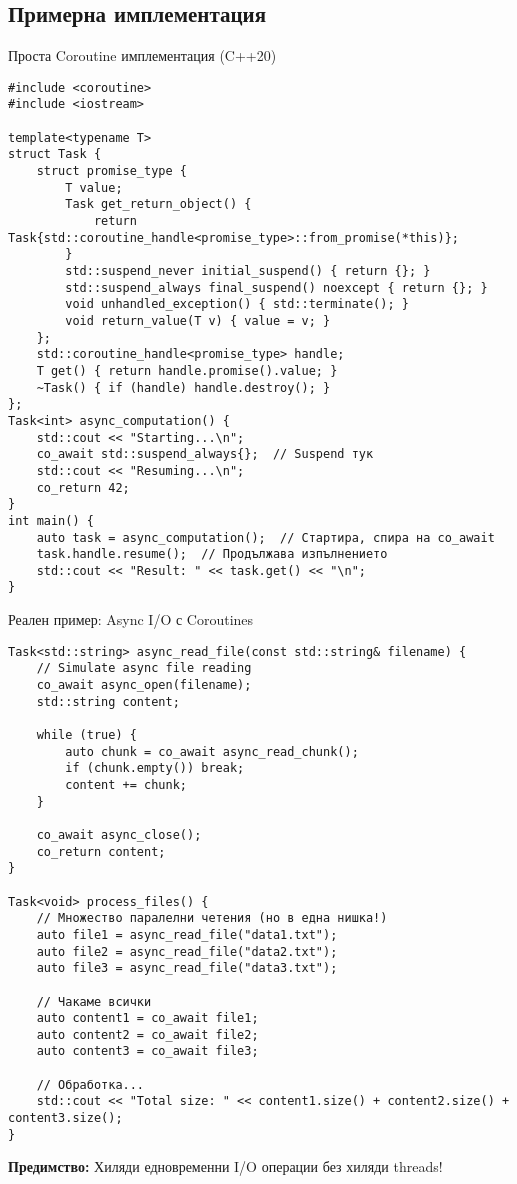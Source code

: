\documentclass[aspectratio=169]{beamer}
\begin{document}
\subsection{Примерна имплементация}

\begin{frame}[fragile]{Проста Coroutine имплементация (C++20)}
\begin{lstlisting}[basicstyle=\ttfamily\tiny]
#include <coroutine>
#include <iostream>

template<typename T>
struct Task {
    struct promise_type {
        T value;
        Task get_return_object() {
            return Task{std::coroutine_handle<promise_type>::from_promise(*this)};
        }
        std::suspend_never initial_suspend() { return {}; }
        std::suspend_always final_suspend() noexcept { return {}; }
        void unhandled_exception() { std::terminate(); }
        void return_value(T v) { value = v; }
    };
    std::coroutine_handle<promise_type> handle;
    T get() { return handle.promise().value; }
    ~Task() { if (handle) handle.destroy(); }
};
Task<int> async_computation() {
    std::cout << "Starting...\n";
    co_await std::suspend_always{};  // Suspend тук
    std::cout << "Resuming...\n";
    co_return 42;
}
int main() {
    auto task = async_computation();  // Стартира, спира на co_await
    task.handle.resume();  // Продължава изпълнението
    std::cout << "Result: " << task.get() << "\n";
}
\end{lstlisting}
\end{frame}

\begin{frame}[fragile]{Реален пример: Async I/O с Coroutines}
\begin{lstlisting}[basicstyle=\ttfamily\tiny]
Task<std::string> async_read_file(const std::string& filename) {
    // Simulate async file reading
    co_await async_open(filename);
    std::string content;
    
    while (true) {
        auto chunk = co_await async_read_chunk();
        if (chunk.empty()) break;
        content += chunk;
    }
    
    co_await async_close();
    co_return content;
}

Task<void> process_files() {
    // Множество паралелни четения (но в една нишка!)
    auto file1 = async_read_file("data1.txt");
    auto file2 = async_read_file("data2.txt");
    auto file3 = async_read_file("data3.txt");
    
    // Чакаме всички
    auto content1 = co_await file1;
    auto content2 = co_await file2;
    auto content3 = co_await file3;
    
    // Обработка...
    std::cout << "Total size: " << content1.size() + content2.size() + content3.size();
}
\end{lstlisting}

\textbf{Предимство:} Хиляди едновременни I/O операции без хиляди threads!
\end{frame}
\end{document}
